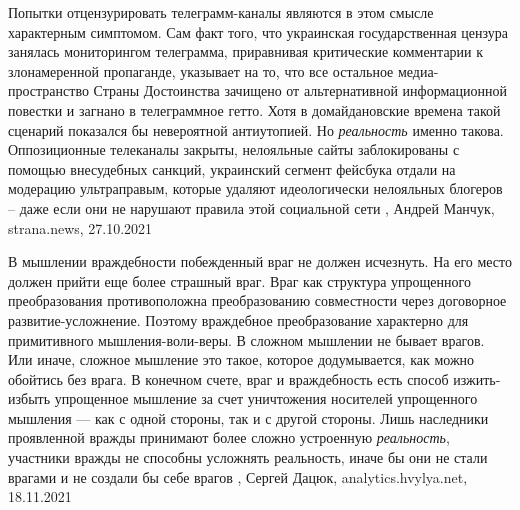 Попытки отцензурировать телеграмм-каналы являются в этом смысле характерным
симптомом. Сам факт того, что украинская государственная цензура занялась
мониторингом телеграмма, приравнивая критические комментарии к злонамеренной
пропаганде, указывает на то, что все остальное медиа-пространство Страны
Достоинства зачищено от альтернативной информационной повестки и загнано в
телеграммное гетто. Хотя в домайдановские времена такой сценарий показался бы
невероятной антиутопией.  Но \emph{реальность} именно такова. Оппозиционные
телеканалы закрыты, нелояльные сайты заблокированы с помощью внесудебных
санкций, украинский сегмент фейсбука отдали на модерацию ультраправым, которые
удаляют идеологически нелояльных блогеров – даже если они не нарушают правила
этой социальной сети
, 
Андрей Манчук, strana.news, 27.10.2021

В мышлении враждебности побежденный враг не должен исчезнуть. На его место
должен прийти еще более страшный враг.  Враг как структура упрощенного
преобразования противоположна преобразованию совместности через договорное
развитие-усложнение.  Поэтому враждебное преобразование характерно для
примитивного мышления-воли-веры. В сложном мышлении не бывает врагов. Или
иначе, сложное мышление это такое, которое додумывается, как можно обойтись без
врага.  В конечном счете, враг и враждебность есть способ изжить-избыть
упрощенное мышление за счет уничтожения носителей упрощенного мышления — как с
одной стороны, так и с другой стороны. Лишь наследники проявленной вражды
принимают более сложно устроенную \emph{реальность}, участники вражды не способны
усложнять реальность, иначе бы они не стали врагами и не создали бы себе врагов
, Сергей Дацюк, analytics.hvylya.net, 18.11.2021
